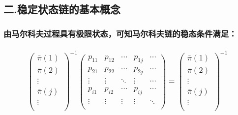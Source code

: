 \documentclass[11pt]{article}
\begin{document}
    \subsection{二.稳定状态链的基本概念}\label{ux4e8c.ux7a33ux5b9aux72b6ux6001ux94feux7684ux57faux672cux6982ux5ff5}

\subsubsection{由马尔科夫过程具有极限状态，可知马尔科夫链的稳态条件满足：}\label{ux7531ux9a6cux5c14ux79d1ux592bux8fc7ux7a0bux5177ux6709ux6781ux9650ux72b6ux6001ux53efux77e5ux9a6cux5c14ux79d1ux592bux94feux7684ux7a33ux6001ux6761ux4ef6ux6ee1ux8db3}

\subsubsection{\texorpdfstring{\[ 
         \left (\begin{matrix}
        \bar\pi(1)\\ \bar\pi(2) \\ \vdots \\ \bar\pi(j)\\ \vdots  \\
        \end{matrix} \right)^{-1}
        \left (\begin{matrix}
        p_{11} & p_{12} & \cdots &p_{1j}& \cdots  \\
        p_{21}  & p_{22} & \cdots &p_{2j}& \cdots \\
        \vdots & \vdots & \ddots & \vdots & \cdots \\
        p_{i1} & p_{i2} & \cdots & p_{ij} & \cdots \\
        \vdots & \vdots & \vdots & \vdots & \ddots \\
        \end{matrix} \right)=
         \left (\begin{matrix}
        \bar\pi(1)\\ \bar\pi(2) \\ \vdots \\ \bar\pi(j)\\ \vdots  \\
        \end{matrix} \right)^{-1}
        \]}{ 
         \textbackslash{}left (\textbackslash{}begin\{matrix\}
        \textbackslash{}bar\textbackslash{}pi(1)\textbackslash{}\textbackslash{} \textbackslash{}bar\textbackslash{}pi(2) \textbackslash{}\textbackslash{} \textbackslash{}vdots \textbackslash{}\textbackslash{} \textbackslash{}bar\textbackslash{}pi(j)\textbackslash{}\textbackslash{} \textbackslash{}vdots  \textbackslash{}\textbackslash{}
}}
\end{document}
